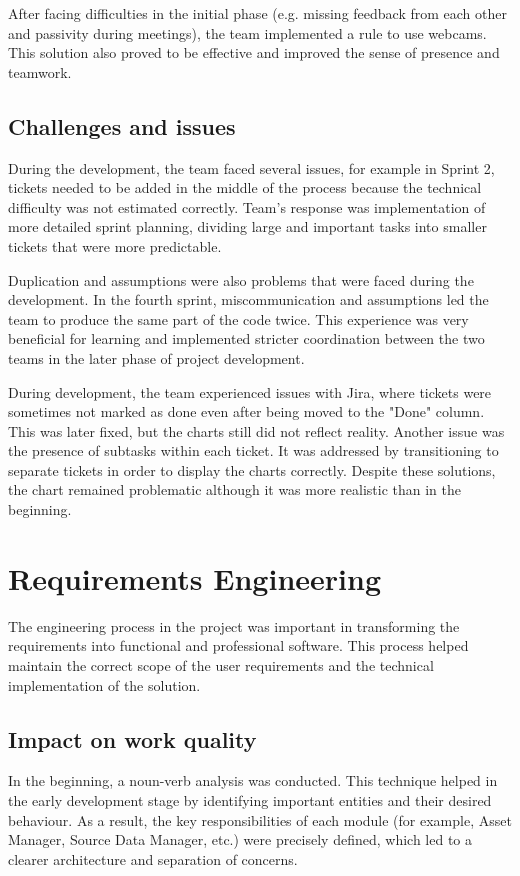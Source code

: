 After facing difficulties in the initial phase (e.g. missing feedback from each other and passivity during meetings), the team implemented a rule to use webcams. This solution also proved to be effective and improved the sense of presence and teamwork.

\subsection{Challenges and issues}
During the development, the team faced several issues, for example in Sprint 2, tickets needed to be added in the middle of the process because the technical difficulty was not estimated correctly. Team’s response was implementation of more detailed sprint planning, dividing large and important tasks into smaller tickets that were more predictable.

Duplication and assumptions were also problems that were faced during the development. In the fourth sprint, miscommunication and assumptions led the team to produce the same part of the code twice. This experience was very beneficial for learning and implemented stricter coordination between the two teams in the later phase of project development.

During development, the team experienced issues with Jira, where tickets were sometimes not marked as done even after being moved to the "Done" column. This was later fixed, but the charts still did not reflect reality. Another issue was the presence of subtasks within each ticket. It was addressed by transitioning to separate tickets in order to display the charts correctly. Despite these solutions, the chart remained problematic although it was more realistic than in the beginning.

\section[Req. Engineering]{Requirements Engineering}
The engineering process in the project was important in transforming the requirements into functional and professional software. This process helped maintain the correct scope of the user requirements and the technical implementation of the solution.

\subsection{Impact on work quality}
In the beginning, a noun-verb analysis was conducted. This technique helped in the early development stage by identifying important entities and their desired behaviour. As a result, the key responsibilities of each module (for example, Asset Manager, Source Data Manager, etc.) were precisely defined, which led to a clearer architecture and separation of concerns.


